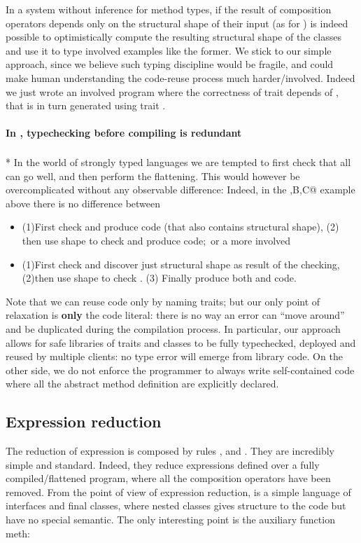 In a system without inference for method types,
if the result of composition operators depends only on the
structural shape of their input (as for \use)
is indeed possible to optimistically compute the resulting structural shape of the classes
and use it to type involved examples like the former.
We stick to our simple approach, since we believe such typing discipline would be fragile,
and could make human understanding the code-reuse process much harder/involved.
Indeed we just wrote an involved program where the correctness of trait \Q@t@ depends of 
\Q@A@, that is in turn generated using trait \Q@t@.

\paragraph{In \name, typechecking before compiling is redundant}${}_{}$\\*
In the world of strongly typed languages we are tempted to
first check that all can go well, and then perform the flattening.
This would however be overcomplicated without any observable difference:
Indeed, in the \Q@A,B,C@ example above there is no difference
between
\begin{itemize}
\item  (1)First check \Q@B@ and produce \Q@B@ code (that also contains \Q@B@ structural shape),
  (2) then use \Q@B@ shape to check \Q@C@ and produce \Q@C@ code;\ 
or a more involved
\item  (1)First check \Q@B@ and discover just \Q@B@ structural shape as result of the checking,
  (2)then use \Q@B@ shape to check \Q@C@.
  (3) Finally produce both \Q@B@ and \Q@C@ code.
\end{itemize}

Note that we can reuse code only by naming traits; but our only point of relaxation is {\bf only} the code literal: there is no way an error can ``move around'' and be duplicated during the compilation process.
In particular, our approach allows for safe libraries of traits and classes to be fully typechecked, deployed and reused by multiple clients: no type error will emerge from library code.
On the other side, we do not enforce the programmer to always write self-contained code where all the abstract method definition are explicitly declared.



\subsection{Expression reduction}
The reduction of expression is composed by rules
, and .
They are incredibly simple and standard.
Indeed, they reduce expressions defined over a fully compiled/flattened program, where all the
composition operators have been removed.
From the point of view of expression reduction, \name is a simple language of 
interfaces and final classes, where nested classes gives structure to the code but have no special semantic.
The only interesting point is the auxiliary function meth:


